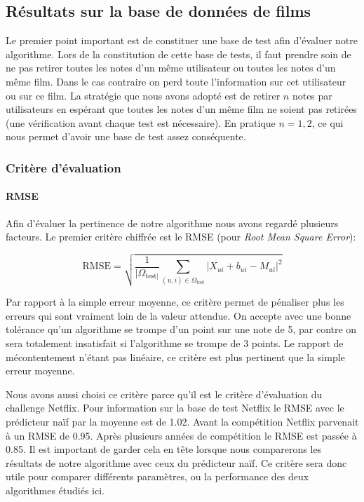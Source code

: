\documentclass[10pt,a4paper]{article}
\begin{document}
\subsection{Résultats sur la base de données de films}

Le premier point important est de constituer une base de test afin d'évaluer notre algorithme. Lors de la constitution de cette base de tests, il faut prendre soin de ne pas retirer toutes les notes d'un même utilisateur ou toutes les notes d'un même film. Dans le cas contraire on perd toute l'information sur cet utilisateur ou sur ce film. La stratégie que nous avons adopté est de retirer $n$ notes par utilisateurs en espérant que toutes les notes d'un même film ne soient pas retirées (une vérification avant chaque test est nécessaire). En pratique $n=1,2$, ce qui nous permet d'avoir une base de test assez conséquente.

\subsubsection*{Critère d'évaluation}

\paragraph{RMSE}

Afin d'évaluer la pertinence de notre algorithme nous avons regardé plusieurs facteurs. Le premier critère chiffrée est le RMSE (pour \textit{Root Mean Square Error}):

$$ \text{RMSE} = \sqrt{\frac{1}{|\Omega_{\text{test}|}}\sum_{(u,i)\in \Omega_{\text{test}}} |X_{ui}+b_{ui}-M_{ui}|^2} $$

Par rapport à la simple erreur moyenne, ce critère permet de pénaliser plus les erreurs qui sont vraiment loin de la  valeur attendue. On accepte avec une bonne tolérance qu'un algorithme se trompe d'un point sur une note de 5, par contre on sera totalement insatisfait si l'algorithme se trompe de 3 points. Le rapport de mécontentement n'étant pas linéaire, ce critère est plus pertinent que la simple erreur moyenne.


Nous avons aussi choisi ce critère parce qu'il est le critère d'évaluation du challenge Netflix. Pour information sur la base de test Netflix le RMSE avec le prédicteur naïf par la moyenne est de 1.02. Avant la compétition Netflix parvenait à un RMSE de 0.95. Après plusieurs années de compétition le RMSE est passée à 0.85. Il est important de garder cela en tête lorsque nous comparerons les résultats de notre algorithme avec ceux du prédicteur naïf. Ce critère sera donc utile pour comparer différents paramètres, ou la performance des deux algorithmes étudiés ici. 
\end{document}
